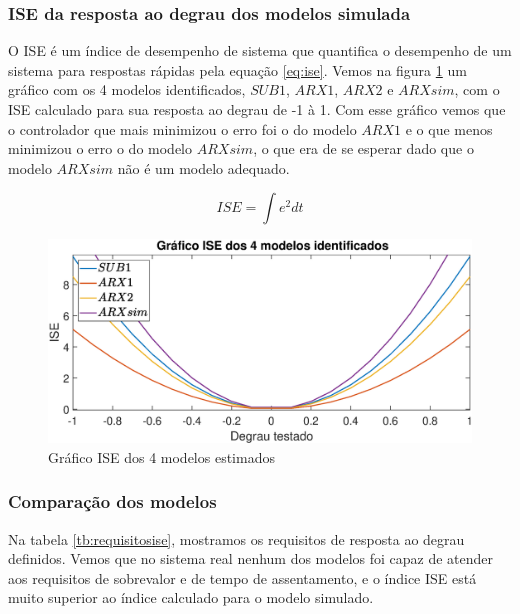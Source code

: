 \subsubsection{ISE da resposta ao degrau dos modelos simulada}

O ISE é um índice de desempenho de sistema que quantifica o desempenho de um sistema para respostas rápidas pela equação \eqref{eq:ise}. Vemos na figura \ref{fig:ise} um gráfico com os 4 modelos identificados, $SUB1$, $ARX1$, $ARX2$ e $ARXsim$, com o ISE calculado para sua resposta ao degrau de -1 à 1. Com esse gráfico vemos que o controlador que mais minimizou o erro foi o do modelo $ARX1$ e o que menos minimizou o erro o do modelo $ARXsim$, o que era de se esperar dado que o modelo $ARXsim$ não é um modelo adequado. 

\begin{equation}\label{eq:ise}
ISE=\int e^2 dt
\end{equation}

\begin{figure}[htb]
	\centering
	\includegraphics[width=1\linewidth]{pasta1_figuras/ise}
	\caption[Gráfico ISE dos 4 modelos estimados]{Gráfico ISE dos 4 modelos estimados}
	\label{fig:ise}
\end{figure}

\subsubsection{Comparação dos modelos}

Na tabela \ref{tb:requisitosise}, mostramos os requisitos de resposta ao degrau definidos. Vemos que no sistema real nenhum dos modelos foi capaz de atender aos requisitos de sobrevalor e de tempo de assentamento, e o índice ISE está muito superior ao índice calculado para o modelo simulado.

